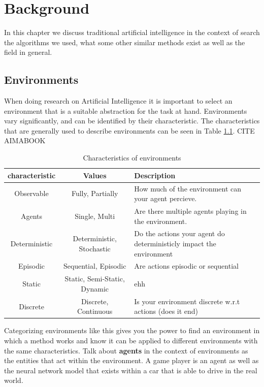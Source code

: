 \chapter{Background\label{cha:background}}

In this chapter we discuss traditional artificial intelligence in the context of search the algorithms we used, what some other similar 
methods exist as well as the field in general.

\section{Environments}
\label{sec:environments}

When doing research on Artificial Intelligence it is important to select 
an environment that is a suitable abstraction for the task at hand. Environments vary 
significantly, and can be identified by their characteristic. The characteristics 
that are generally used to describe environments can be seen in Table \ref{tab:env_characteristics}. 
CITE AIMABOOK

\begin{table}[h]
  \centering
  \begin{tabular}{|c|c|p{6cm}|}
    \hline
    \textbf{characteristic} & \textbf{Values} & \textbf{Description}\\
    \hline
    Observable & Fully, Partially & How much of the environment can your agent percieve.\\
    \hline
    Agents & Single, Multi & Are there multiple agents playing in the environment.\\
    \hline
    Deterministic & Deterministic, Stochastic & Do the actions your agent do deterministicly impact the environment\\
    \hline
    Episodic & Sequential, Episodic & Are actions episodic or sequential\\
    \hline
    Static & Static, Semi-Static, Dynamic & ehh  \\
    \hline
    Discrete & Discrete, Continuous & Is your environment discrete w.r.t actions (does it end) \\
    \hline
  \end{tabular}
  \caption{Characteristics of environments}
  \label{tab:env_characteristics}
\end{table}

Categorizing environments like this gives you the power to find an environment in which 
a method works and know it can be applied to different environments with the same characteristics.
Talk about \textbf{agents} in the context of environments as the entities that act within the 
environment. A game player is an agent as well as the neural network model that exists within 
a car that is able to drive in the real world.

